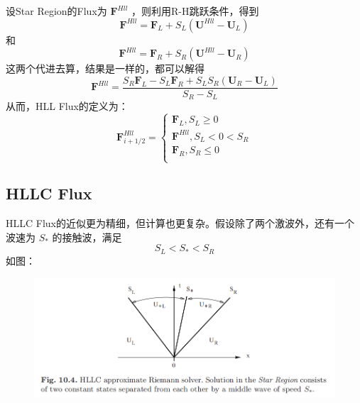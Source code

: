 \documentclass{book}
\begin{document}
设Star Region的Flux为 $\mathbf F^{Hll}$ ，则利用R-H跳跃条件，得到
\begin{equation}
  \mathbf{F}^{Hll}=\mathbf{F}_L+S_L\left( \mathbf{U}^{Hll}-\mathbf{U}_L \right)
\end{equation}
和
\begin{equation}
  \mathbf{F}^{Hll}=\mathbf{F}_R+S_R\left( \mathbf{U}^{Hll}-\mathbf{U}_R \right)
\end{equation}
这两个代进去算，结果是一样的，都可以解得
\begin{equation}
  \displaystyle \mathbf{F}^{Hll}=\frac{S_R\mathbf{F}_L-S_L\mathbf{F}_R+S_LS_R\left( \mathbf{U}_R-\mathbf{U}_L \right)}{S_R-S_L}
\end{equation}
从而，HLL Flux的定义为：
\begin{equation}
  \mathbf{F}_{i+1/2}^{Hll}=\begin{cases}
    \mathbf{F}_L,S_L\ge 0      \\
    \mathbf{F}^{Hll},S_L<0<S_R \\
    \mathbf{F}_R,S_R\le 0      \\
  \end{cases}
\end{equation}





\subsection{HLLC Flux}
HLLC Flux的近似更为精细，但计算也更复杂。假设除了两个激波外，还有一个波速为 $S_*$ 的接触波，满足
\begin{equation}
  S_L<S_*<S_R
\end{equation}
如图：
\begin{figure}[htp]
  \centering
  \label{fig:}
  \includegraphics[width=0.7\linewidth]{fig/HLLC.png}
  \caption{}
\end{figure}
\end{document}
